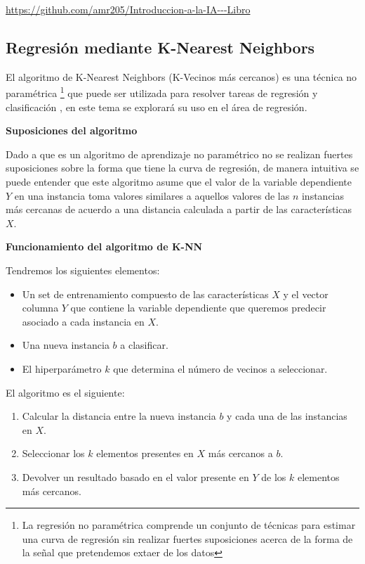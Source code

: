 \documentclass[11pt,fleqn]{book} %
\begin{document}
\url{https://github.com/amr205/Introduccion-a-la-IA---Libro}

\clearpage

\subsection{Regresión mediante K-Nearest Neighbors}  \label{subsection:knn}

El algoritmo de K-Nearest Neighbors (K-Vecinos más cercanos) es una técnica no paramétrica \footnote{La regresión no paramétrica comprende un conjunto de técnicas para estimar una curva de regresión sin realizar fuertes suposiciones acerca de la forma de la señal que pretendemos extaer de los datos} que puede ser utilizada para resolver tareas de regresión y clasificación \cite{knn_intro}, en este tema se explorará su uso en el área de regresión.

\textbf{Suposiciones del algoritmo}

Dado a que es un algoritmo de aprendizaje no paramétrico no se realizan fuertes suposiciones sobre la forma que tiene la curva de regresión, de manera intuitiva se puede entender que este algoritmo asume que el valor de la variable dependiente $Y$ en una instancia toma valores similares a aquellos valores de las $n$ instancias más cercanas de acuerdo a una distancia calculada a partir de las características $X$.

\textbf{Funcionamiento del algoritmo de K-NN}

Tendremos los siguientes elementos:

\begin{itemize}
\item  Un set de entrenamiento compuesto de las características $X$ y el vector columna $Y$ que contiene la variable dependiente que queremos predecir asociado a cada instancia en $X$.
\item Una nueva instancia $b$ a clasificar.
\item El hiperparámetro $k$ que determina el número de vecinos a seleccionar.
\end{itemize}

El algoritmo es el siguiente:
\begin{enumerate}
\item Calcular la distancia entre la nueva instancia $b$ y cada una de las instancias en $X$.
\item Seleccionar los $k$ elementos presentes en $X$ más cercanos a $b$.
\item Devolver un resultado basado en el valor presente en $Y$ de los $k$ elementos más cercanos.
\end{enumerate}
\end{document}
